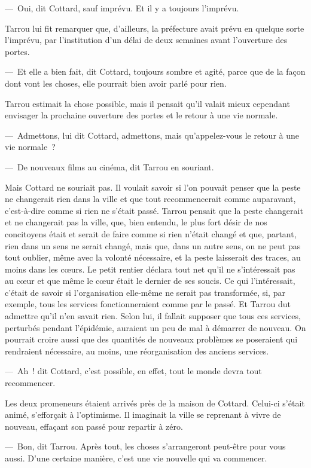 \documentclass[french,twoside]{book} %
\begin{document}
— Oui, dit Cottard, sauf imprévu. Et il y a toujours l’imprévu.\par
Tarrou lui fit remarquer que, d’ailleurs, la préfecture avait prévu en quelque sorte l’imprévu, par l’institution d’un délai de deux semaines avant l’ouverture des portes.\par
— Et elle a bien fait, dit Cottard, toujours sombre et agité, parce que de la façon dont vont les choses, elle pourrait bien avoir parlé pour rien.\par
Tarrou estimait la chose possible, mais il pensait qu’il valait mieux cependant envisager la prochaine ouverture des portes et le retour à une vie normale.\par
— Admettons, lui dit Cottard, admettons, mais qu’appelez-vous le retour à une vie normale ?\par
— De nouveaux films au cinéma, dit Tarrou en souriant.\par
Mais Cottard ne souriait pas. Il voulait savoir si l’on pouvait penser que la peste ne changerait rien dans la ville et que tout recommencerait comme auparavant, c’est-à-dire comme si rien ne s’était passé. Tarrou pensait que la peste changerait et ne changerait pas la ville, que, bien entendu, le plus fort désir de nos concitoyens était et serait de faire comme si rien n’était changé et que, partant, rien dans un sens ne serait changé, mais que, dans un autre sens, on ne peut pas tout oublier, même avec la volonté nécessaire, et la peste laisserait des traces, au moins dans les cœurs. Le petit rentier déclara tout net qu’il ne s’intéressait pas au cœur et que même le cœur était le dernier de ses soucis. Ce qui l’intéressait, c’était de savoir si l’organisation elle-même ne serait pas transformée, si, par exemple, tous les services fonctionneraient comme par le passé. Et Tarrou dut admettre qu’il n’en savait rien. Selon lui, il fallait supposer que tous ces services, perturbés pendant l’épidémie, auraient un peu de mal à démarrer de nouveau. On pourrait croire aussi que des quantités de nouveaux problèmes se poseraient qui rendraient nécessaire, au moins, une réorganisation des anciens services.\par
— Ah ! dit Cottard, c’est possible, en effet, tout le monde devra tout recommencer.\par
Les deux promeneurs étaient arrivés près de la maison de Cottard. Celui-ci s’était animé, s’efforçait à l’optimisme. Il imaginait la ville se reprenant à vivre de nouveau, effaçant son passé pour repartir à zéro.\par
— Bon, dit Tarrou. Après tout, les choses s’arrangeront peut-être pour vous aussi. D’une certaine manière, c’est une vie nouvelle qui va commencer.\par
\end{document}

